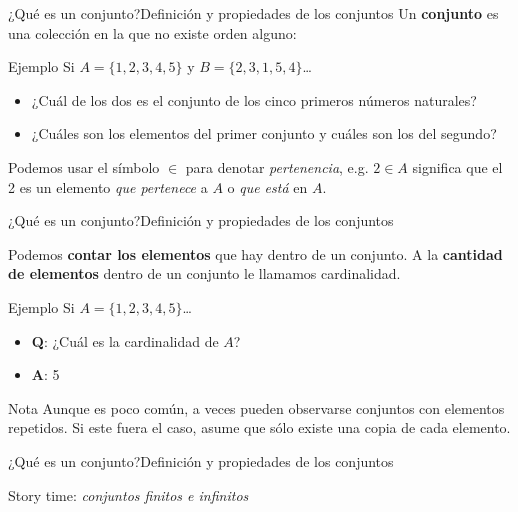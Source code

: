 \documentclass[spanish, c]{beamer}
\begin{document}
\begin{frame}{¿Qué es un conjunto?}{Definición y propiedades de los conjuntos}
    Un \textbf{conjunto} es una colección en la que \alert{no existe orden alguno}:
    \bigskip
    \begin{exampleblock}{Ejemplo}
        Si $A = \{1, 2, 3, 4, 5\}$ y $B = \{2, 3, 1, 5, 4\}$\dots

        \begin{itemize}
            \item ¿Cuál de los dos es el conjunto de los cinco primeros números naturales?
            \item ¿Cuáles son los elementos del primer conjunto y cuáles son los del segundo?
        \end{itemize}
    \end{exampleblock}

    Podemos usar el símbolo $\in$ para denotar \textit{pertenencia}, e.g. $2 \in A$ significa que el 2 es un elemento \textit{que pertenece} a $A$ o \textit{que está} en $A$.
\end{frame}

\begin{frame}{¿Qué es un conjunto?}{Definición y propiedades de los conjuntos}
    
    Podemos \textbf{contar los elementos} que hay dentro de un conjunto.
    A la \textbf{cantidad de elementos} dentro de un conjunto le llamamos \alert{cardinalidad}. \pause

    \bigskip

    \begin{exampleblock}{Ejemplo}
        Si $A = \{1, 2, 3, 4, 5\}$\dots

        \begin{itemize}
            \item \textbf{Q}: ¿Cuál es la cardinalidad de $A$?
            \item \textbf{A}: 5
        \end{itemize}
    \end{exampleblock} \pause

    \begin{block}{Nota}
        Aunque es poco común, a veces pueden observarse conjuntos con elementos repetidos.
        Si este fuera el caso, asume que sólo existe una copia de cada elemento.
    \end{block}

\end{frame}

\begin{frame}{¿Qué es un conjunto?}{Definición y propiedades de los conjuntos}    
    \begin{center}
        \Huge
        Story time: \textit{conjuntos finitos e infinitos}
    \end{center}
\end{frame}
\end{document}
